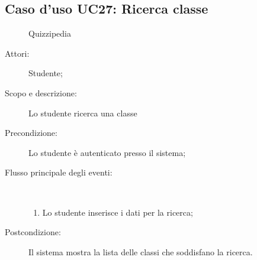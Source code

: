 \subsection{Caso d'uso UC27: Ricerca classe}
	\begin{figure}[H]
		\centering
		\begin{resizedtikzpicture}{\textwidth}
		\begin{umlsystem}[x=0, fill=lightgray!20]{Quizzipedia}
		\end{umlsystem}
		\end{resizedtikzpicture}
		\caption{}
	\end{figure}
\begin{description}
\item[Attori:] Studente;
\item[Scopo e descrizione:] Lo studente ricerca una classe
      \item[Precondizione:] Lo studente è autenticato presso il sistema;

        \item[Flusso principale degli eventi:] \ 
 \begin{enumerate}
          \item Lo studente inserisce i dati per la ricerca;

      \end{enumerate}
    \item[Postcondizione:] Il sistema mostra la lista delle classi che soddisfano la ricerca.
  \end{description}
\hypertarget{UC28}{}
